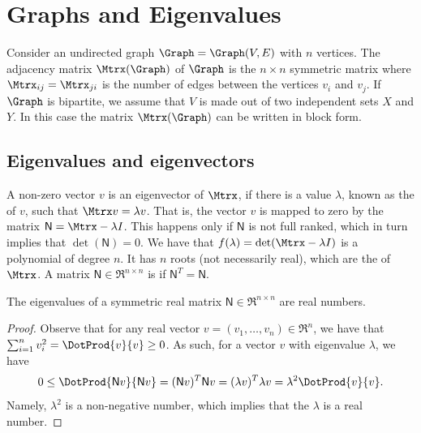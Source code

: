 
\makeatletter
{}
\makeatother
\ifx\bookMode\undefined%
\fi





\ChapterPrefix{}
\ChapterGen{}



\section{Graphs and Eigenvalues}

Consider an undirected graph $\Graph = \Graph(V,E)$ with $n$
vertices. The adjacency matrix $\Mtrx(\Graph)$ of $\Graph$ is the $n\times
n$ symmetric matrix where $\Mtrx_{ij} = \Mtrx_{ji}$ is the number of
edges between the vertices $v_i$ and $v_j$. If $\Graph$ is bipartite,
we assume that $V$ is made out of two independent sets $X$ and $Y$. In
this case the matrix $\Mtrx(\Graph)$ can be written in block form.

\newcommand{\MA}{\mathsf{N}}%
\subsection{Eigenvalues and eigenvectors}

A non-zero vector $v$ is an eigenvector of $\Mtrx$, if there is a
value $\lambda$, known as the  of $v$, such that
$\Mtrx v = \lambda v$. That is, the vector $v$ is mapped to zero by
the matrix $\MA = \Mtrx - \lambda I$. This happens only if $\MA$ is
not full ranked, which in turn implies that $\det(\MA)=0$. We have
that $f(\lambda ) =\det(\Mtrx - \lambda I)$ is a polynomial of degree
$n$. It has $n$ roots (not necessarily real), which are the
 of $\Mtrx$. A matrix $\MA \in \Re^{n\times n}$ is
 if $\MA^T = \MA$.

\begin{lemma}
    The eigenvalues of a symmetric real matrix $\MA \in \Re^{n \times
       n}$ are real numbers.
\end{lemma}
\begin{proof}
    Observe that for any real vector $v=(v_1, \ldots, v_n) \in \Re^n$,
    we have that $\sum_{i=1}^n v_i^2 = \DotProd{v}{v} \geq 0$. As
    such, for a vector $v$ with eigenvalue $\lambda$, we have
    \begin{equation*}
        0 \leq 
        \DotProd{ \MA v}{\MA v} = (\MA v)^T \MA v
        = (\lambda v)^T \lambda v
        = \lambda^2 \DotProd{v}{v}.
    \end{equation*}
    Namely, $\lambda^2$ is a non-negative number, which implies that
    the $\lambda$ is a real number.
\end{proof}

